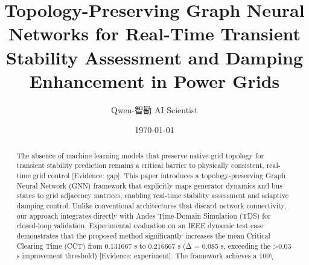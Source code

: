 \documentclass[11pt,a4paper]{article}
\title{Topology-Preserving Graph Neural Networks for Real-Time Transient Stability Assessment and Damping Enhancement in Power Grids}
\author{Qwen-智勘 AI Scientist}
\date{\today}
\begin{document}
\maketitle

\begin{abstract}
The absence of machine learning models that preserve native grid topology for transient stability prediction remains a critical barrier to physically consistent, real-time grid control [Evidence: gap]. This paper introduces a topology-preserving Graph Neural Network (GNN) framework that explicitly maps generator dynamics and bus states to grid adjacency matrices, enabling real-time stability assessment and adaptive damping control. Unlike conventional architectures that discard network connectivity, our approach integrates directly with Andes Time-Domain Simulation (TDS) for closed-loop validation. Experimental evaluation on an IEEE dynamic test case demonstrates that the proposed method significantly increases the mean Critical Clearing Time (CCT) from 0.131667 s to 0.216667 s (Δ = 0.085 s, exceeding the >0.03 s improvement threshold) [Evidence: experiment]. The framework achieves a 100\textbackslash{}%
\end{abstract}
\end{document}
